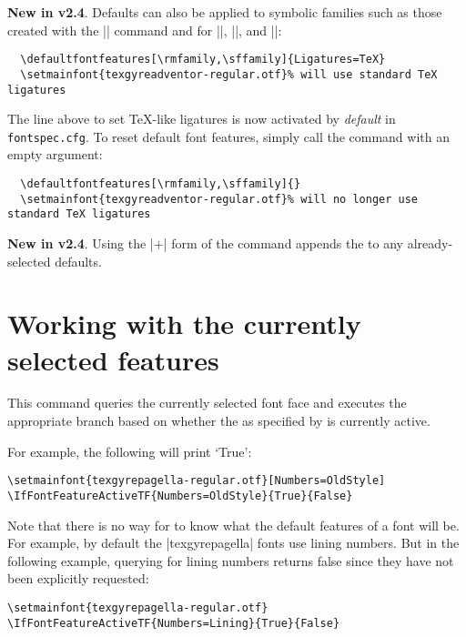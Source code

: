 \documentclass[a4paper]{l3doc}
\begin{document}
\textbf{New in v2.4}.
Defaults can also be applied to symbolic families such as those created with the |\newfontfamily| command and for |\rmfamily|, |\sffamily|, and |\ttfamily|:
\begin{Verbatim}
  \defaultfontfeatures[\rmfamily,\sffamily]{Ligatures=TeX}
  \setmainfont{texgyreadventor-regular.otf}% will use standard TeX ligatures
\end{Verbatim}
The line above to set \TeX-like ligatures is now activated by \emph{default} in \texttt{fontspec.cfg}.
To reset default font features, simply call the command with an empty argument:
\begin{Verbatim}
  \defaultfontfeatures[\rmfamily,\sffamily]{}
  \setmainfont{texgyreadventor-regular.otf}% will no longer use standard TeX ligatures
\end{Verbatim}


\textbf{New in v2.4}.
Using the |+| form of the command appends the  to any already-selected defaults.


\section{Working with the currently selected features}
\label{sec:addfontfeatures}



This command queries the currently selected font face and executes the appropriate branch based on whether the  as specified by  is currently active.

For example, the following will print `True':
\begin{Verbatim}
\setmainfont{texgyrepagella-regular.otf}[Numbers=OldStyle]
\IfFontFeatureActiveTF{Numbers=OldStyle}{True}{False}
\end{Verbatim}

Note that there is no way for  to know what the default features of a font will be. For example, by default the |texgyrepagella| fonts use lining numbers. But in the following example, querying for lining numbers returns false since they have not been explicitly requested:
\begin{Verbatim}
\setmainfont{texgyrepagella-regular.otf}
\IfFontFeatureActiveTF{Numbers=Lining}{True}{False}
\end{Verbatim}
\end{document}
